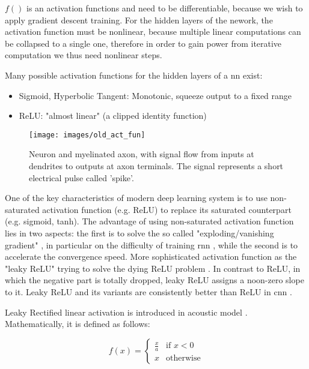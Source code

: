 \noindent $f()$ is an activation functions and need to be differentiable, because we wish to apply gradient descent training. For the hidden layers of the nework, the activation function must be nonlinear, because multiple linear computations can be collapsed to a single one, therefore in order to gain power from iterative computation we thus need nonlinear steps.

\noindent Many possible activation functions for the hidden layers of a \gls{nn} exist:
\begin{itemize}
	\item Sigmoid, Hyperbolic Tangent: Monotonic, squeeze output to a fixed range
	\item ReLU: "almost linear" (a clipped identity function)
\end{itemize}

\begin{figure}[H]
	\centering
	\texttt{[image: images/old\_act\_fun]}
	\caption[Image of a human neuron.]{Neuron and myelinated axon, with signal flow from inputs at dendrites to outputs at axon terminals. The signal represents a short electrical pulse called 'spike'.}
	\label{fig:old_act_fun}
\end{figure}

\noindent One of the key characteristics of modern deep learning system is to use non-saturated activation function (e.g. ReLU) to replace its saturated counterpart (e.g. sigmoid, tanh). The advantage of using non-saturated activation function lies in two aspects: the first is to solve the so called "exploding/vanishing gradient" \cite[]{bengio1994learning}, in particular on the difficulty of training \gls{rnn} \cite[]{pascanu2013difficulty}, while the second is to accelerate the convergence speed. More sophisticated activation function as the "leaky ReLU" trying to solve the dying ReLU problem \cite[]{LeakyReL95:online}. In contrast to ReLU, in which the negative part is totally dropped, leaky ReLU assigns a noon-zero slope to it. Leaky ReLU and its variants are consistently better than ReLU in \gls{cnn} \cite[]{xu2015empirical}.

\noindent Leaky Rectified linear activation is introduced in acoustic model \cite[]{maas2013rectifier}. Mathematically, it is defined as follows:

\begin{Equation}[H]
	\centering
	\begin{equation} \label{eq:leakyrelu}
 		f(x) = 
			\begin{cases}
			\frac{x}{a} & \text{if $x < 0 $} \\
			x & \text{otherwise}
		\end{cases}
	\end{equation}
	\caption[Leaky Rectified linear activation.]{Function that idetifies input transformation at each step $l$ of the net.}
\end{Equation}

